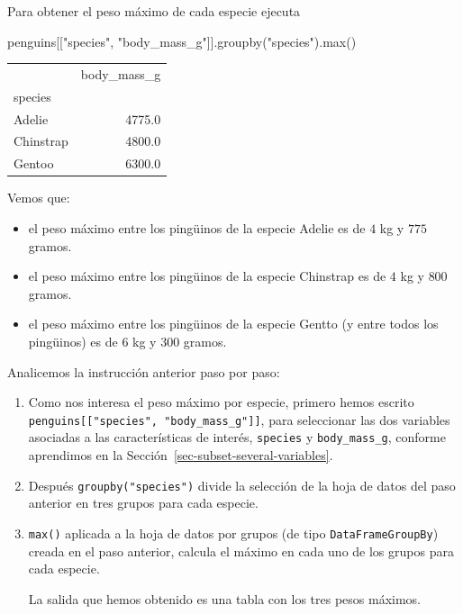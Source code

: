 \documentclass[
  a4paper,
  noprof,
  12pt,
  notoc,
  nosols,
  nobib]{mnye}
\newenvironment{Shaded}{\begin{snugshade}}{\end{snugshade}}
\newcommand{\BuiltInTok}[1]{\textcolor[rgb]{0.00,0.23,0.31}{#1}}
\newcommand{\NormalTok}[1]{\textcolor[rgb]{0.00,0.23,0.31}{#1}}
\newcommand{\StringTok}[1]{\textcolor[rgb]{0.13,0.47,0.30}{#1}}
\providecommand{\tightlist}{%
  \setlength{\itemsep}{0pt}\setlength{\parskip}{0pt}}\usepackage{longtable,booktabs,array}
\theoremstyle{definition}
\theoremstyle{remark}
\begin{document}
Para obtener el peso máximo de cada especie ejecuta

\begin{Shaded}
\begin{Highlighting}[]
\NormalTok{penguins[[}\StringTok{"species"}\NormalTok{, }\StringTok{"body\_mass\_g"}\NormalTok{]].groupby(}\StringTok{"species"}\NormalTok{).}\BuiltInTok{max}\NormalTok{()}
\end{Highlighting}
\end{Shaded}

\begin{tabular}{lr}
\toprule
{} &  body\_mass\_g \\
species   &              \\
\midrule
Adelie    &       4775.0 \\
Chinstrap &       4800.0 \\
Gentoo    &       6300.0 \\
\bottomrule
\end{tabular}

Vemos que:

\begin{itemize}
\tightlist
\item
  el peso máximo entre los pingüinos de la especie Adelie es de \(4\) kg
  y \(775\) gramos.
\item
  el peso máximo entre los pingüinos de la especie Chinstrap es de \(4\)
  kg y \(800\) gramos.
\item
  el peso máximo entre los pingüinos de la especie Gentto (y entre todos
  los pingüinos) es de \(6\) kg y \(300\) gramos.
\end{itemize}

Analicemos la instrucción anterior paso por paso:

\begin{enumerate}
\def\labelenumi{\arabic{enumi}.}
\item
  Como nos interesa el peso máximo por especie, primero hemos escrito
  \texttt{penguins{[}{[}"species",\ "body\_mass\_g"{]}{]}}, para
  seleccionar las dos variables asociadas a las características de
  interés, \texttt{species} y \texttt{body\_mass\_g}, conforme
  aprendimos en la Sección~\ref{sec-subset-several-variables}.
\item
  Después \texttt{groupby("species")} divide la selección de la hoja de
  datos del paso anterior en tres grupos para cada especie.
\item
  \texttt{max()} aplicada a la hoja de datos por grupos (de tipo
  \texttt{DataFrameGroupBy}) creada en el paso anterior, calcula el
  máximo en cada uno de los grupos para cada especie.

  La salida que hemos obtenido es una tabla con los tres pesos máximos.
\end{enumerate}
\end{document}
